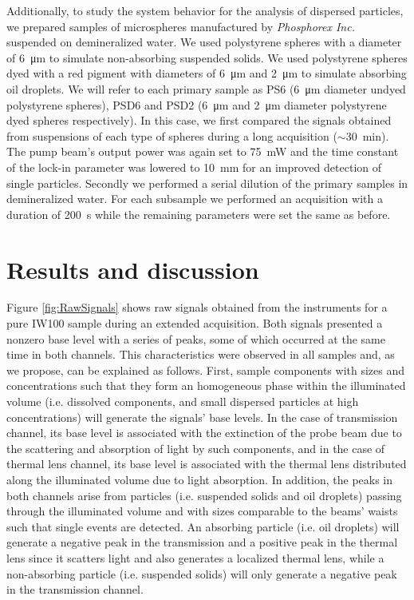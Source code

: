 \documentclass[9pt,twocolumn,twoside]{osajnl}
\begin{document}
Additionally, to study the system behavior for the analysis of dispersed particles, we prepared samples of microspheres manufactured by \emph{Phosphorex Inc.} suspended on demineralized water. We used polystyrene spheres with a diameter of \SI{6}{\micro\metre} to simulate non-absorbing suspended solids. We used polystyrene spheres dyed with a red pigment with diameters of \SI{6}{\micro\metre} and \SI{2}{\micro\metre} to simulate absorbing oil droplets. We will refer to each primary sample as PS6 (\SI{6}{\micro\metre} diameter undyed polystyrene spheres), PSD6 and PSD2 (\SI{6}{\micro\metre} and \SI{2}{\micro\metre} diameter polystyrene dyed spheres respectively). In this case, we first compared the signals obtained from suspensions of each type of spheres during a long acquisition ($\sim $\SI{30}{\minute}). The pump beam's output power was again set to \SI{75}{\milli\watt} and the time constant of the lock-in parameter was lowered to \SI{10}{\milli\metre} for an improved detection of single particles. Secondly we performed a serial dilution of the primary samples in demineralized water. For each subsample we performed an acquisition with a duration of \SI{200}{\second} while the remaining parameters were set the same as before.








\section{Results and discussion}
\label{Results}

Figure \ref{fig:RawSignals} shows raw signals obtained from the instruments for a pure IW100 sample during an extended acquisition. Both signals presented a nonzero base level with a series of peaks, some of which occurred at the same time in both channels. This characteristics were observed in all samples and, as we propose, can be explained as follows. First, sample components with sizes and concentrations such that they form an homogeneous phase within the illuminated volume (i.e. dissolved components, and small dispersed particles at high concentrations) will generate the signals' base levels. In the case of transmission channel, its base level is associated with the extinction of the probe beam due to the scattering and absorption of light by such components, and in the case of thermal lens channel, its base level is associated with the thermal lens distributed along the illuminated volume due to light absorption. In addition, the peaks in both channels arise from particles (i.e. suspended solids and oil droplets) passing through the illuminated volume and with sizes comparable to the beams' waists such that single events are detected. An absorbing particle (i.e. oil droplets) will generate a negative peak in the transmission and a positive peak in the thermal lens since it scatters light and also generates a localized thermal lens, while a non-absorbing particle (i.e. suspended solids) will only generate a negative peak in the transmission channel.
\end{document}
